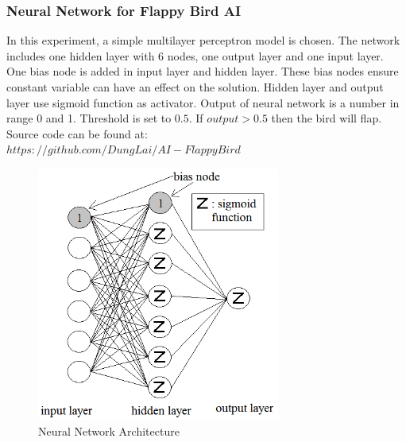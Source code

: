 \documentclass[conference]{IEEEtran}
\begin{document}
\subsubsection{Neural Network for Flappy Bird AI}
In this experiment, a simple multilayer perceptron model \cite{5} is chosen. The network includes one hidden layer with 6 nodes, one output layer and one input layer. One bias node is added in input layer and hidden layer. These bias nodes ensure constant variable can have an effect on the solution. Hidden layer and output layer use sigmoid function as activator.
Output of neural network is a number in range 0 and 1. Threshold is set to $0.5$. If $output>0.5$ then the bird will flap. \\
Source code can be found at: \\ $https://github.com/DungLai/AI-FlappyBird$
\begin{figure}[H]
    \centering
    \includegraphics[width=8cm]{neural}
    \caption{Neural Network Architecture}
    \label{fig:fig6}
\end{figure}
\end{document}
